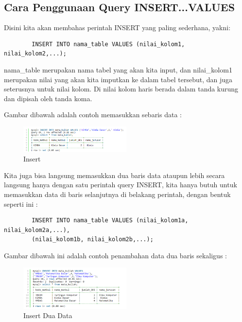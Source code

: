 	\subsection{Cara Penggunaan Query INSERT...VALUES}
	Disini kita akan membahas perintah INSERT yang paling sederhana, yakni:
	
	\begin{verbatim}
		INSERT INTO nama_table VALUES (nilai_kolom1, nilai_kolom2,...);
	\end{verbatim}
	
	nama_table merupakan nama tabel yang akan kita input, dan nilai_kolom1 merupakan nilai yang akan kita imputkan ke dalam tabel tersebut, dan juga seterusnya untuk nilai kolom. Di nilai kolom haris berada dalam tanda kurung dan dipisah oleh tanda koma.
	
	Gambar dibawah adalah contoh memasukkan sebaris data :
	
	\begin{figure}[ht]
			\centerline{\includegraphics[width=0.5\textwidth]{figures/insert.png}}
			\caption{Insert}
			\label{insert}
			\end{figure}
			
	Kita juga bisa langsung memasukkan dua baris data ataupun lebih secara langsung hanya dengan satu perintah query INSERT, kita hanya butuh untuk memasukkan data di baris selanjutnya di belakang perintah, dengan bentuk seperti ini :
	
	\begin{verbatim}
		INSERT INTO nama_table VALUES (nilai_kolom1a, nilai_kolom2a,...), 
		(nilai_kolom1b, nilai_kolom2b,...);
	\end{verbatim}
	
	Gambar dibawah ini adalah contoh penambahan data dua baris sekaligus :
	
	\begin{figure}[ht]
			\centerline{\includegraphics[width=0.5\textwidth]{figures/insert2.png}}
			\caption{Insert Dua Data}
			\label{insert2}
			\end{figure}
	
